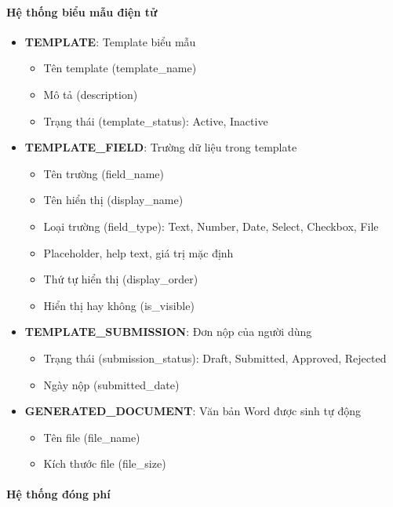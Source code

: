 \paragraph{Hệ thống biểu mẫu điện tử}

\begin{itemize}[leftmargin=*]
    \item \textbf{TEMPLATE}: Template biểu mẫu
    \begin{itemize}
        \item Tên template (template\_name)
        \item Mô tả (description)
        \item Trạng thái (template\_status): Active, Inactive
    \end{itemize}
    
    \item \textbf{TEMPLATE\_FIELD}: Trường dữ liệu trong template
    \begin{itemize}
        \item Tên trường (field\_name)
        \item Tên hiển thị (display\_name)
        \item Loại trường (field\_type): Text, Number, Date, Select, Checkbox, File
        \item Placeholder, help text, giá trị mặc định
        \item Thứ tự hiển thị (display\_order)
        \item Hiển thị hay không (is\_visible)
    \end{itemize}
    
    \item \textbf{TEMPLATE\_SUBMISSION}: Đơn nộp của người dùng
    \begin{itemize}
        \item Trạng thái (submission\_status): Draft, Submitted, Approved, Rejected
        \item Ngày nộp (submitted\_date)
    \end{itemize}
    
    \item \textbf{GENERATED\_DOCUMENT}: Văn bản Word được sinh tự động
    \begin{itemize}
        \item Tên file (file\_name)
        \item Kích thước file (file\_size)
    \end{itemize}
\end{itemize}

\paragraph{Hệ thống đóng phí}

